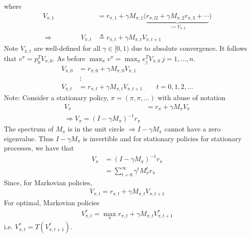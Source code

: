 \documentclass[]{article}
\begin{document}
where
\begin{align}
V_{\pi,1} & = r_{\pi,1} + \gamma M_{\pi,1} \Big(
\underbrace{r_{\pi,l2} + \gamma M_{\pi,2} r_{\pi,3} + \cdots}_{:=V_{\pi,2}} \Big) \\
\Rightarrow \qquad \qquad V_{\pi,t} &  \triangleq r_{\pi,t} + \gamma M_{\pi,t} V_{\pi,t+1}
\end{align}
Note $V_{\pi,t}$ are well-defined for all $\gamma \in [0,1)$ due to absolute convergence.  It follows that $v^\pi = p_0^T V_{\pi,0}$. As before $\max_\pi v^\pi = \max_\pi e_j^T V_{\pi,0} \ j=1,\dots,n$.  
\begin{align}
V_{\pi,0} & = r_{\pi,0} + \gamma M_{\pi,0} V_{\pi,1} \\
& \ \vdots \\
V_{\pi,t} & = r_{\pi,t} + \gamma M_{\pi,t} V_{\pi,t+1} \qquad t=0,1,2,\dots
\end{align}
Note: Consider a stationary policy, $\pi = (\pi,\pi,\dots)$ with abuse of notation
\begin{align}
V_\pi & = r_\pi + \gamma M_\pi V_\pi \\
\Rightarrow V_\pi = (I-\gamma M_\pi)^{-1} r_\pi
\end{align}
The spectrum of $M_\pi$ is in the unit circle $\Rightarrow I- \gamma M_\pi$ cannot have a zero eigenvalue.  Thus $I-\gamma M_\pi$ is invertible and for stationary policies for stationary processes, we have that
\begin{align}
V_\pi & = (I-\gamma M_\pi)^{-1} r_\pi \\
& = \sum_{t=0}^\infty \gamma^t M_\pi^t r_\pi
\end{align}
Since, for Markovian policies, 
\begin{align}
V_{\pi,t} = r_{\pi,t} + \gamma M_{\pi,t} V_{\pi,t+1}
\end{align}
For optimal, Markovian policies
\begin{align}
V^*_{\pi,t} = \max_\pi r_{\pi,t} + \gamma M_{\pi,t} V_{\pi,t+1}^*
\end{align}
i.e. $V_{\pi,t}^* = T(V_{\pi,t+1}^*)$.
\end{document}
